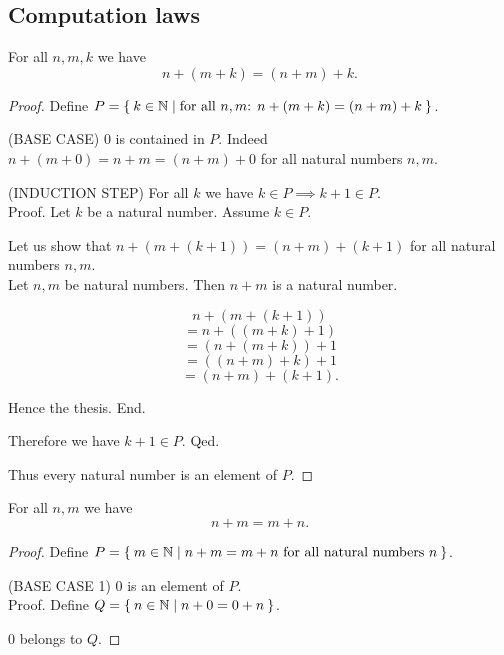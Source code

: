 \documentclass[../../natural-numbers.ftl.tex]{subfiles}
\begin{document}
  \subsection{Computation laws}

  \begin{forthel}
    \begin{proposition}[NN 01 02 468785]
      For all $n,m,k$ we have \[ n + (m + k) = (n + m) + k. \]
    \end{proposition}
    \begin{proof}
      Define $P = \Set{ k \in \mathbb{N} | \text{for all $n,m$: $n + (m + k) = (n + m) + k$}}$.

      (BASE CASE) $0$ is contained in $P$.
      Indeed $n + (m + 0) = n + m = (n + m) + 0$ for all natural numbers $n,m$.

      (INDUCTION STEP) For all $k$ we have $k \in P \implies k + 1 \in P$. \\
      Proof.
        Let $k$ be a natural number.
         Assume $k \in P$.

        Let us show that $n + (m + (k + 1)) = (n + m) + (k + 1)$ for all natural numbers $n,m$. \\
          Let $n,m$ be natural numbers.
          Then $n + m$ is a natural number.

          \[   n + (m + (k + 1)) \]
          \[ = n + ((m + k) + 1) \]  %
          \[ = (n + (m + k)) + 1 \]  %
          \[ = ((n + m) + k) + 1 \]  %
          \[ = (n + m) + (k + 1). \] %

          Hence the thesis.
        End.

        Therefore we have $k + 1 \in P$.
      Qed.

      Thus every natural number is an element of $P$.
    \end{proof}


    \begin{proposition}[NN 01 02 273100]
      For all $n,m$ we have \[ n + m = m + n. \]
    \end{proposition}
    \begin{proof}
      Define $P = \Set{m \in \mathbb{N} | \text{$n + m = m + n$ for all natural numbers $n$}}$.

      (BASE CASE 1) $0$ is an element of $P$. \\
      Proof.
        Define $Q = \Set{n \in \mathbb{N} | n + 0 = 0 + n}$.

        $0$ belongs to $Q$.


\end{proof}
\end{forthel}
\end{document}
